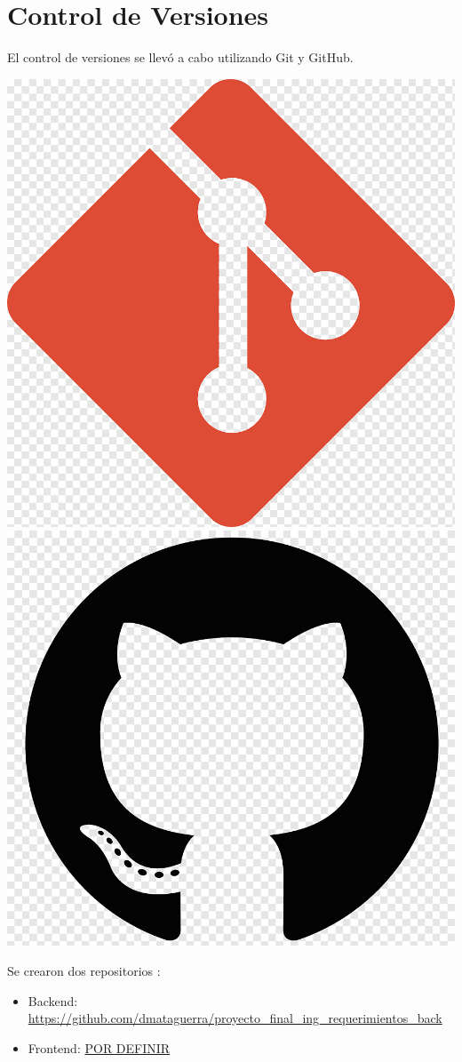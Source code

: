 	\section{Control de Versiones}
	El control de versiones se llevó a cabo utilizando Git y GitHub. 
		\begin{center}
		\includegraphics[width=0.3\linewidth]{./images/gitlogo.png}
		\includegraphics[width=0.3\linewidth]{./images/github_logo.png}
	\end{center}
	Se crearon dos repositorios :
	\begin{itemize}
		\item 	Backend: \url{https://github.com/dmataguerra/proyecto_final_ing_requerimientos_back}
		\item   Frontend: \url{POR DEFINIR}	
	\end{itemize}
